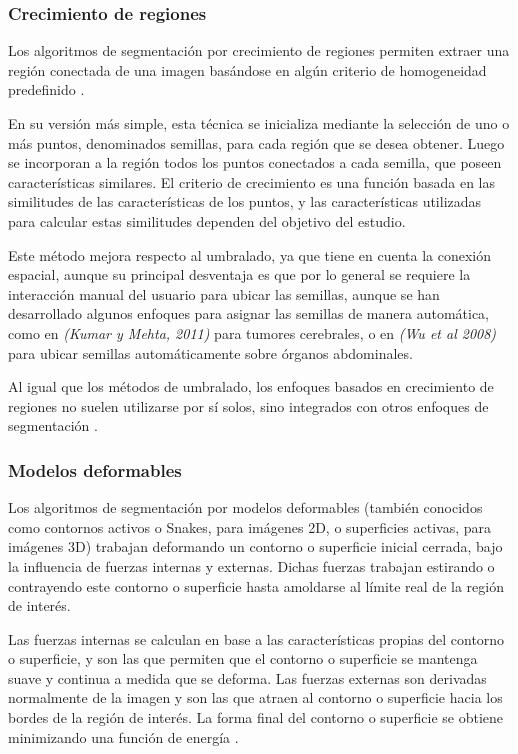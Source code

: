 \subsubsection{Crecimiento de regiones}
Los algoritmos de segmentación por crecimiento de regiones permiten extraer una región conectada de una imagen basándose en algún criterio de homogeneidad predefinido \citep{haralick1985image}.

En su versión más simple, esta técnica se inicializa mediante la selección de uno o más puntos, denominados semillas, para cada región que se desea obtener. Luego se incorporan a la región todos los puntos conectados a cada semilla, que poseen características similares. El criterio de crecimiento es una función basada en las similitudes de las características de los puntos, y las características utilizadas para calcular estas similitudes dependen del objetivo del estudio.

Este método mejora respecto al umbralado, ya que tiene en cuenta la conexión espacial, aunque su principal desventaja es que por lo general se requiere la interacción manual del usuario para ubicar las semillas, aunque se han desarrollado algunos enfoques para asignar las semillas de manera automática, como en \emph{(Kumar y Mehta, 2011)} para tumores cerebrales, o en \emph{(Wu et al 2008)} para ubicar semillas automáticamente sobre órganos abdominales.

Al igual que los métodos de umbralado, los enfoques basados en crecimiento de regiones no suelen utilizarse por sí solos, sino integrados con otros enfoques de segmentación \citep{freixenet2002yet}.

\subsubsection{Modelos deformables}
Los algoritmos de segmentación por modelos deformables (también conocidos como contornos activos o Snakes, para imágenes 2D, o superficies activas, para imágenes 3D) trabajan deformando un contorno o superficie inicial cerrada, bajo la influencia de fuerzas internas y externas. Dichas fuerzas trabajan estirando o contrayendo este contorno o superficie hasta amoldarse al límite real de la región de interés.

Las fuerzas internas se calculan en base a las características propias del contorno o superficie, y son las que permiten que el contorno o superficie se mantenga suave y continua a medida que se deforma.  Las fuerzas externas son derivadas normalmente de la imagen y son las que atraen al contorno o superficie hacia los bordes de la región de interés. La forma final del contorno o superficie se obtiene minimizando una función de energía \citep{pham2000current}.

